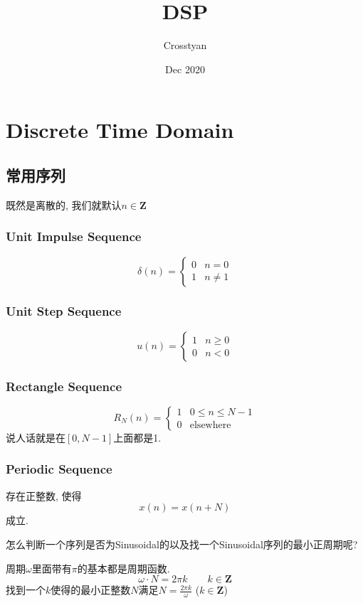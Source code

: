 \documentclass[a4paper]{report}
\title{DSP}
\author{Crosstyan}
\date{Dec 2020}
\begin{document}
\chapter{Discrete Time Domain}
\section{常用序列}
既然是离散的, 我们就默认$n\in \textbf{Z}$
\subsection{Unit Impulse Sequence}
\begin{equation}
    \delta(n)=
  \begin{cases}
    0 & n=0
    \\ 1 & n\neq 1
  \end{cases}
\end{equation}
\subsection{Unit Step Sequence}
\begin{equation}
  u(n)=\begin{cases}
    1& n\geq 0
    \\ 0& n<0
  \end{cases}
\end{equation}
\subsection{Rectangle Sequence}
\begin{equation}
  R_N(n)=\begin{cases}
    1 & 0\leq n\leq N-1
    \\ 0 & \text{elsewhere}
  \end{cases}
\end{equation}
说人话就是在$[0,N-1]$上面都是1. 
\subsection{Periodic Sequence}
存在正整数, 使得
\begin{equation}
  x(n)=x(n+N)
\end{equation}
成立.

怎么判断一个序列是否为Sinusoidal的以及找一个Sinusoidal序列的最小正周期呢? 

周期$\omega$里面带有$\pi$的基本都是周期函数. 
$$\omega\cdot N=2\pi k\quad\quad k\in \textbf{Z}$$
找到一个$k$使得的最小正整数$N$满足$N=\frac{2\pi k}{\omega}$ ($k\in \textbf{Z}$)
\end{document}
